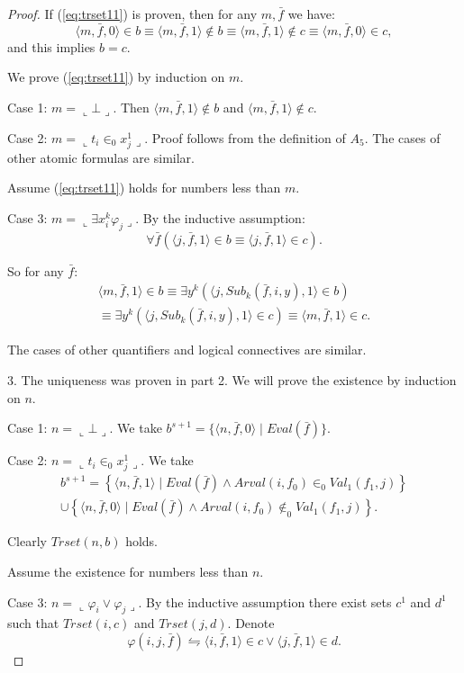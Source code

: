\documentclass{asl}
\theoremstyle{definition}
\begin{document}
\begin{proof}
If (\ref{eq:trset11}) is proven, then for any $m,\bar{f}$ we have:
\[\langle m,\bar{f},0\rangle\in b\equiv\langle m,\bar{f},1\rangle\notin b\equiv\langle m,\bar{f},1\rangle\notin c\equiv\langle m,\bar{f},0\rangle\in c,\]
and this implies $b=c$.

We prove (\ref{eq:trset11}) by induction on $m$.

Case 1: $m=\llcorner\bot\lrcorner$. Then $\langle m,\bar{f},1\rangle\notin b$ and $\langle m,\bar{f},1\rangle\notin c$.

Case 2: $m=\llcorner t_i\in_0 x_j^1\lrcorner$. Proof follows from the definition of $A_5$. The cases of other atomic formulas are similar.

Assume (\ref{eq:trset11}) holds for numbers less than $m$.

Case 3: $m=\llcorner\exists x_i^k  \varphi_j\lrcorner$.
By the inductive assumption: 
\[\forall \bar{f}(\langle j,\bar{f},1\rangle\in b\equiv\langle j,\bar{f},1\rangle\in c).\]

So for any $ \bar{f}$:
\begin{multline*}
\langle m,\bar{f},1\rangle\in b
\equiv
\exists y^k
(\langle j,Sub_k(\bar{f},i,y),1\rangle\in b)
\\
\equiv
\exists y^k
(\langle j,Sub_k(\bar{f},i,y),1\rangle\in c)
\equiv\langle m,\bar{f},1\rangle\in c.
\end{multline*}

The cases of other quantifiers and logical connectives are similar.

3. The uniqueness was proven in part 2. We will prove the existence by induction on $n$.

Case 1: $n=\llcorner\bot\lrcorner$. We take $b^{s+1}=\lbrace\langle n,\bar{f},0\rangle\mid Eval(\bar{f})\rbrace.$

Case 2: $n=\llcorner t_i\in_0 x_j^1\lrcorner$. We take 
\begin{multline*}
b^{s+1}=\left\lbrace \langle n,\bar{f},1\rangle\mid Eval(\bar{f})\wedge Arval(i,f_0)\in_0 Val_1(f_1,j)\right\rbrace 
\\
\cup
\left\lbrace \langle n,\bar{f},0\rangle\mid Eval(\bar{f})\wedge Arval(i,f_0)\notin_0 Val_1(f_1,j)\right\rbrace .
\end{multline*}

Clearly $Trset(n,b)$ holds.

Assume the existence for numbers less than $n$.

Case 3: $n=\llcorner\varphi_i\vee \varphi_j\lrcorner$. By the inductive assumption there exist sets $c^1$ and $d^1$ such that $Trset(i,c)$ and $Trset(j,d)$. Denote 
\[\varphi( i,j,\bar{f})\leftrightharpoons \langle i,\bar{f},1\rangle\in c\vee \langle j,\bar{f},1\rangle\in d.\]


\end{proof}
\end{document}
